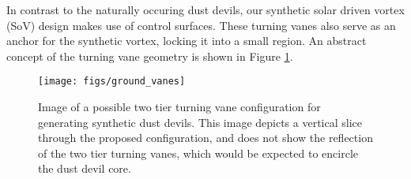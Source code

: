 In contrast to the naturally occuring dust devils,
our synthetic solar driven vortex (SoV) design makes use of
control surfaces. These turning vanes also serve as an anchor for the
synthetic vortex, locking it into a small region. An abstract concept of
the turning vane geometry is shown in Figure \ref{fig:cartoon_vanes}.

  \begin{figure}[!htb]
    \begin{center}
     \texttt{[image: figs/ground\_vanes]}
     \caption{Image of a possible two tier turning vane 
       configuration for generating synthetic dust devils. This image depicts a 
       vertical slice through the proposed configuration, and does not show the reflection 
       of the two tier turning vanes, which would be expected to encircle the dust devil core.}
     \label{fig:cartoon_vanes}
    \end{center}
  \end{figure}




